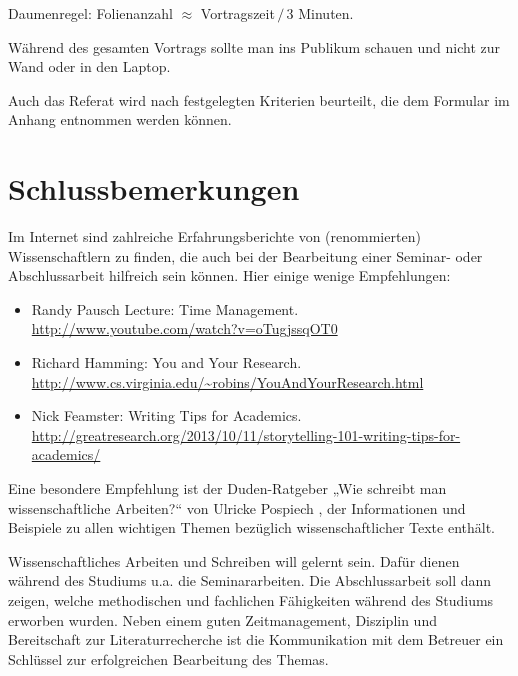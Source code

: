 \documentclass[
    fontsize=12pt,
    headings=small,
    parskip=half,           %
    bibliography=totoc,
    numbers=noenddot,       %
    open=any,               %
    ]{scrreprt}
\begin{document}
Daumenregel: Folienanzahl $\approx$ Vortragszeit$\,/\,$3 Minuten.

Während des gesamten Vortrags sollte man ins Publikum schauen und nicht zur Wand oder in den Laptop.

Auch das Referat wird nach festgelegten Kriterien beurteilt, die dem Formular im Anhang entnommen werden können.

\chapter{Schlussbemerkungen}

Im Internet sind zahlreiche Erfahrungsberichte von (renommierten) Wissenschaftlern zu finden, die auch bei der Bearbeitung einer Seminar- oder Abschlussarbeit hilfreich sein können. Hier einige wenige Empfehlungen:

\begin{itemize}
	\item Randy Pausch Lecture: Time Management. \\ \url{http://www.youtube.com/watch?v=oTugjssqOT0}
	\item Richard Hamming: You and Your Research. \\ \url{http://www.cs.virginia.edu/~robins/YouAndYourResearch.html}
	\item Nick Feamster: Writing Tips for Academics. \\ \url{http://greatresearch.org/2013/10/11/storytelling-101-writing-tips-for-academics/}
\end{itemize}

Eine besondere Empfehlung ist der Duden-Ratgeber „Wie schreibt man wissenschaftliche Arbeiten?“ von Ulricke Pospiech \cite{Posp2012}, der Informationen und Beispiele zu allen wichtigen Themen bezüglich wissenschaftlicher Texte enthält.

Wissenschaftliches Arbeiten und Schreiben will gelernt sein. Dafür dienen während des Studiums u.a. die Seminararbeiten. Die Abschlussarbeit soll dann zeigen, welche methodischen und fachlichen Fähigkeiten während des Studiums erworben wurden. Neben einem guten Zeitmanagement, Disziplin und Bereitschaft zur Literaturrecherche ist die Kommunikation mit dem Betreuer ein Schlüssel zur erfolgreichen Bearbeitung des Themas.


\begin{raggedright}         %
  \printbibliography        %
  \label{sec:literaturverzeichnis}
\end{raggedright}
\end{document}
